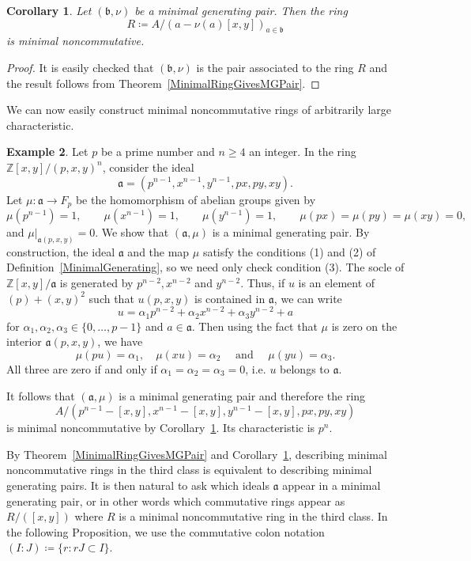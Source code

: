 \documentclass[11pt]{article}
\newtheorem{corollary}{Corollary}[section]
\theoremstyle{definition}
\newtheorem{numberedexample}[corollary]{Example}
\begin{document}
\begin{corollary}\label{MinimalPairGivesMinimalRing}
Let $(\mathfrak{b},\nu)$ be a minimal generating pair. Then the ring
\[R\coloneqq A/\left(a-\nu(a)[x,y]\right)_{a\in\mathfrak{b}}\]
is minimal noncommutative.
\end{corollary}

\begin{proof}
It is easily checked that $(\mathfrak{b},\nu)$ is the pair associated to the ring $R$ and the result follows from Theorem~\ref{MinimalRingGivesMGPair}.
\end{proof}

We can now easily construct minimal noncommutative rings of arbitrarily large characteristic.

\begin{numberedexample}
Let $p$ be a prime number and $n\geq 4$ an integer. In the ring $\mathbb{Z}[x,y]/(p,x,y)^n$, consider the ideal
\[\mathfrak{a}=\left(p^{n-1},x^{n-1},y^{n-1},px,py,xy\right).\]
Let $\mu:\mathfrak{a}\to F_p$ be the homomorphism of abelian groups given by
\[\mu(p^{n-1})=1,\qquad\mu(x^{n-1})=1,\qquad\mu(y^{n-1})=1,\qquad\mu(px)=\mu(py)=\mu(xy)=0,\]
and $\mu|_{\mathfrak{a}(p,x,y)}=0$.
We show that $(\mathfrak{a},\mu)$ is a minimal generating pair. By construction, the ideal $\mathfrak{a}$ and the map $\mu$ satisfy the conditions (1) and (2) of Definition~\ref{MinimalGenerating}, so we need only check condition (3). The socle of $\mathbb{Z}[x,y]/\mathfrak{a}$ is generated by $p^{n-2}, x^{n-2}$ and $y^{n-2}$. Thus, if $u$ is an element of $(p)+(x,y)^2$ such that $u(p,x,y)$ is contained in $\mathfrak{a}$, we can write
\[u=\alpha_1 p^{n-2}+\alpha_2 x^{n-2}+\alpha_3 y^{n-2}+a\]
for $\alpha_1,\alpha_2,\alpha_3\in\lbrace 0,\ldots,p-1\rbrace$ and $a\in\mathfrak{a}$. Then using the fact that $\mu$ is zero on the interior $\mathfrak{a}(p,x,y)$, we have
\[\mu(pu)=\alpha_1,\quad \mu(xu)=\alpha_2 \quad \text{ and }\quad \mu(yu)=\alpha_3.\]
All three are zero if and only if $\alpha_1=\alpha_2=\alpha_3=0$, i.e. $u$ belongs to $\mathfrak{a}$.

It follows that $(\mathfrak{a},\mu)$ is a minimal generating pair and therefore the ring
\[A/\left(p^{n-1}-[x,y],x^{n-1}-[x,y],y^{n-1}-[x,y],px,py,xy\right)\]
is minimal noncommutative by Corollary~\ref{MinimalPairGivesMinimalRing}. Its characteristic is $p^{n}$.
\end{numberedexample}

By Theorem~\ref{MinimalRingGivesMGPair} and Corollary~\ref{MinimalPairGivesMinimalRing}, describing minimal noncommutative rings in the third class is equivalent to describing minimal generating pairs. It is then natural to ask which ideals $\mathfrak{a}$ appear in a minimal generating pair, or in other words which commutative rings appear as $R/([x,y])$ where $R$ is a minimal noncommutative ring in the third class. In the following Proposition, we use the commutative colon notation $\left(I:J\right)\coloneqq\lbrace r:rJ\subset I\rbrace$.
\end{document}
